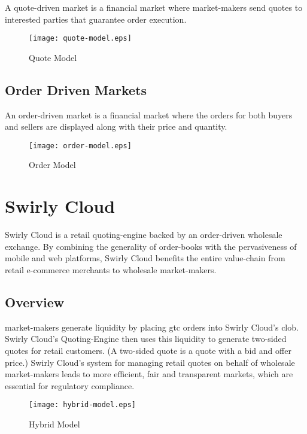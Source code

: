 \documentclass[12pt,a4paper,notitlepage,bibliography=totoc]{scrreprt}
\newcommand{\swirly}{Swirly Cloud}
\begin{document}
A \gls{quote-driven} \gls{market} is a financial \gls{market} where \glspl{market-maker} send
\glspl{quote} to interested parties that guarantee order execution.

\begin{figure}[H]
\centering
\texttt{[image: quote-model.eps]}
\caption{Quote Model}
\end{figure}

\section{Order Driven Markets}

An \gls{order-driven} \gls{market} is a financial \gls{market} where the \glspl{order} for both
buyers and sellers are displayed along with their price and quantity.

\begin{figure}[H]
\centering
\texttt{[image: order-model.eps]}
\caption{Order Model}
\end{figure}

\chapter{Swirly Cloud}

\swirly{} is a retail quoting-engine backed by an \gls{order-driven} wholesale \gls{exchange}. By
combining the generality of \glspl{order-book} with the pervasiveness of mobile and \gls{web}
platforms, \swirly{} benefits the entire value-chain from retail \gls{e-commerce} \glspl{merchant}
to wholesale \glspl{market-maker}.

\section{Overview}

\Glspl{market-maker} generate \gls{liquidity} by placing \gls{gtc} \glspl{order} into \swirly{}'s
\gls{clob}. \swirly{}'s Quoting-Engine then uses this \gls{liquidity} to generate two-sided
\glspl{quote} for retail customers. (A two-sided \gls{quote} is a \gls{quote} with a \gls{bid} and
\gls{offer} price.) \swirly{}'s system for managing retail \glspl{quote} on behalf of wholesale
\glspl{market-maker} leads to more efficient, fair and transparent \glspl{market}, which are
essential for regulatory compliance.

\begin{figure}[H]
\centering
\texttt{[image: hybrid-model.eps]}
\caption{Hybrid Model}
\end{figure}
\end{document}
